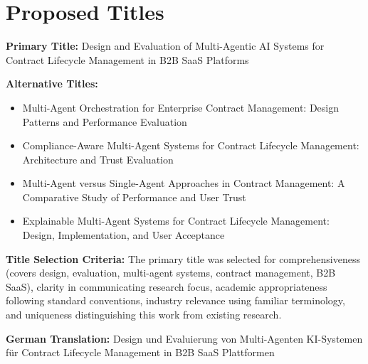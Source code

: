 
\chapter{Proposed Titles}\label{chapter:proposed_titles}

\textbf{Primary Title:} Design and Evaluation of Multi-Agentic AI Systems for Contract Lifecycle Management in B2B SaaS Platforms

\textbf{Alternative Titles:}
\begin{itemize}
    \item Multi-Agent Orchestration for Enterprise Contract Management: Design Patterns and Performance Evaluation
    \item Compliance-Aware Multi-Agent Systems for Contract Lifecycle Management: Architecture and Trust Evaluation
    \item Multi-Agent versus Single-Agent Approaches in Contract Management: A Comparative Study of Performance and User Trust
    \item Explainable Multi-Agent Systems for Contract Lifecycle Management: Design, Implementation, and User Acceptance
\end{itemize}

\textbf{Title Selection Criteria:} The primary title was selected for comprehensiveness (covers design, evaluation, multi-agent systems, contract management, B2B SaaS), clarity in communicating research focus, academic appropriateness following standard conventions, industry relevance using familiar terminology, and uniqueness distinguishing this work from existing research.

\textbf{German Translation:} Design und Evaluierung von Multi-Agenten KI-Systemen für Contract Lifecycle Management in B2B SaaS Plattformen
